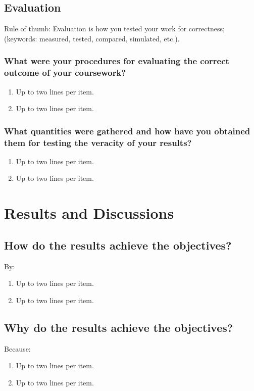 \subsection{Evaluation}
\label{sec:eval}

Rule of thumb: Evaluation is how you tested your  work for correctness; (keywords: measured, tested, compared, simulated, etc.).

\subsubsection{What were your procedures for evaluating the correct outcome of your coursework?}
\begin{enumerate}
	\item Up to two lines per item.
	\item Up to two lines per item.
\end{enumerate}

\subsubsection{What quantities were gathered and how have you obtained them for testing the veracity of your results?}
\begin{enumerate}
	\item Up to two lines per item.
	\item Up to two lines per item.
\end{enumerate}


\section{Results and Discussions}

\subsection{How do the results achieve the objectives?}
By:
\begin{enumerate}
	\item Up to two lines per item.
	\item Up to two lines per item.
\end{enumerate}

\subsection{Why do the results achieve the objectives?}
Because:
\begin{enumerate}
	\item Up to two lines per item.
	\item Up to two lines per item.
\end{enumerate}


